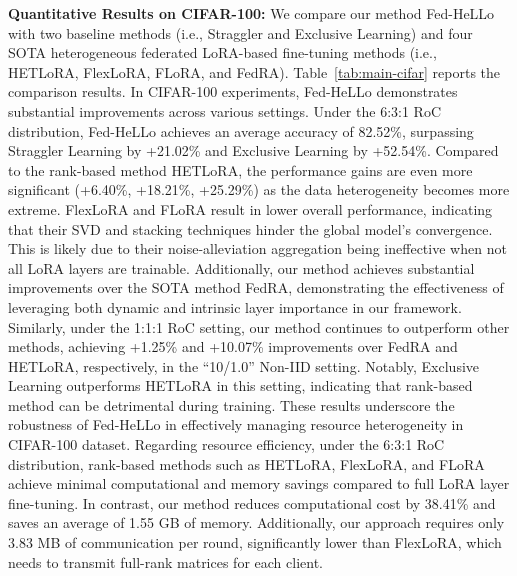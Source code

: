 \documentclass[lettersize,journal]{IEEEtran}
\begin{document}
\textbf{Quantitative Results on CIFAR-100:} We compare our method Fed-HeLLo with two baseline methods (i.e., Straggler and Exclusive Learning) and four SOTA heterogeneous federated LoRA-based fine-tuning methods (i.e., HETLoRA, FlexLoRA, FLoRA, and FedRA). Table~\ref{tab:main-cifar} reports the comparison results. In CIFAR-100 experiments, Fed-HeLLo demonstrates substantial improvements across various settings. Under the 6:3:1 RoC distribution, Fed-HeLLo achieves an average accuracy of 82.52\%, surpassing Straggler Learning by +21.02\% and Exclusive Learning by +52.54\%. {Compared to the rank-based method HETLoRA, the performance gains are even more significant (+6.40\%, +18.21\%, +25.29\%) as the data heterogeneity becomes more extreme. FlexLoRA and FLoRA result in lower overall performance, indicating that their SVD and stacking techniques hinder the global model's convergence. This is likely due to their noise-alleviation aggregation being ineffective when not all LoRA layers are trainable.} Additionally, our method achieves substantial improvements over the SOTA method FedRA, demonstrating the effectiveness of leveraging both dynamic and intrinsic layer importance in our framework. Similarly, under the 1:1:1 RoC setting, our method continues to outperform other methods, achieving +1.25\% and +10.07\% improvements over FedRA and HETLoRA, respectively, in the ``10/1.0'' Non-IID setting. Notably, Exclusive Learning outperforms HETLoRA in this setting, indicating that rank-based method can be detrimental during training. These results underscore the robustness of Fed-HeLLo in effectively managing resource heterogeneity in CIFAR-100 dataset. {Regarding resource efficiency, under the 6:3:1 RoC distribution, rank-based methods such as HETLoRA, FlexLoRA, and FLoRA achieve minimal computational and memory savings compared to full LoRA layer fine-tuning. In contrast, our method reduces computational cost by 38.41\% and saves an average of 1.55 GB of memory. Additionally, our approach requires only 3.83 MB of communication per round, significantly lower than FlexLoRA, which needs to transmit full-rank matrices for each client.
}
\end{document}
